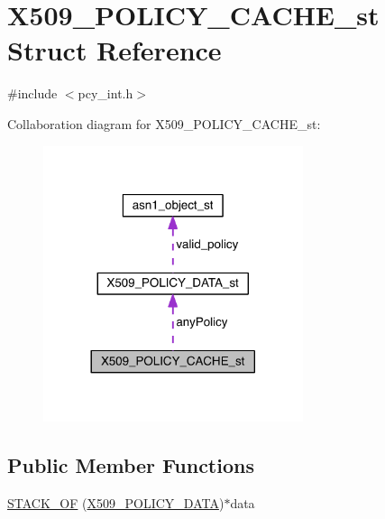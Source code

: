 \hypertarget{struct_x509___p_o_l_i_c_y___c_a_c_h_e__st}{}\section{X509\+\_\+\+P\+O\+L\+I\+C\+Y\+\_\+\+C\+A\+C\+H\+E\+\_\+st Struct Reference}
\label{struct_x509___p_o_l_i_c_y___c_a_c_h_e__st}


{\ttfamily \#include $<$pcy\+\_\+int.\+h$>$}



Collaboration diagram for X509\+\_\+\+P\+O\+L\+I\+C\+Y\+\_\+\+C\+A\+C\+H\+E\+\_\+st\+:\nopagebreak
\begin{figure}[H]
\begin{center}
\leavevmode
\includegraphics[width=216pt]{struct_x509___p_o_l_i_c_y___c_a_c_h_e__st__coll__graph}
\end{center}
\end{figure}
\subsection*{Public Member Functions}
\begin{DoxyCompactItemize}
\item 
\hyperlink{struct_x509___p_o_l_i_c_y___c_a_c_h_e__st_a2d0a42a6a89fe603acd13f24aae0c85d}{S\+T\+A\+C\+K\+\_\+\+OF} (\hyperlink{pcy__int_8h_a0a96e7c084ee8bfa265612987136abd0}{X509\+\_\+\+P\+O\+L\+I\+C\+Y\+\_\+\+D\+A\+TA})$\ast$data
\end{DoxyCompactItemize}

